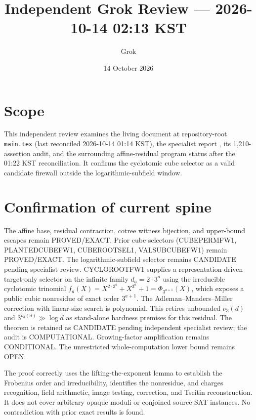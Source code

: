 \documentclass[11pt]{article}
\title{Independent Grok Review --- 2026-10-14 02:13 KST}
\author{Grok}
\date{14 October 2026}
\begin{document}
\maketitle

\begin{center}
\end{center}

\section{Scope}
This independent review examines the living document at repository-root \texttt{main.tex} (last reconciled 2026-10-14 01:14 KST), the specialist report , its 1,210-assertion audit, and the surrounding affine-residual program status after the 01:22 KST reconciliation. It confirms the cyclotomic cube selector as a valid candidate firewall outside the logarithmic-subfield window.

\section{Confirmation of current spine}
The affine base, residual contraction, cotree witness bijection, and upper-bound escapes remain PROVED/EXACT. Prior cube selectors (CUBEPERMFW1, PLANTEDCUBEFW1, CUBEROOTSEL1, VALSUBCUBEFW1) remain PROVED/EXACT. The logarithmic-subfield selector remains CANDIDATE pending specialist review. CYCLOROOTFW1 supplies a representation-driven target-only selector on the infinite family $d_a=2\cdot3^a$ using the irreducible cyclotomic trinomial $f_a(X)=X^{2\cdot3^a}+X^{3^a}+1=\Phi_{3^{a+1}}(X)$, which exposes a public cubic nonresidue of exact order $3^{a+1}$. The Adleman--Manders--Miller correction with linear-size search is polynomial. This retires unbounded $\nu_3(d)$ and $3^{\nu_3(d)}\gg\log d$ as stand-alone hardness premises for this residual. The theorem is retained as CANDIDATE pending independent specialist review; the audit is COMPUTATIONAL. Growing-factor amplification remains CONDITIONAL. The unrestricted whole-computation lower bound remains OPEN.

The proof correctly uses the lifting-the-exponent lemma to establish the Frobenius order and irreducibility, identifies the nonresidue, and charges recognition, field arithmetic, image testing, correction, and Tseitin reconstruction. It does not cover arbitrary opaque moduli or conjoined source SAT instances. No contradiction with prior exact results is found.
\end{document}
